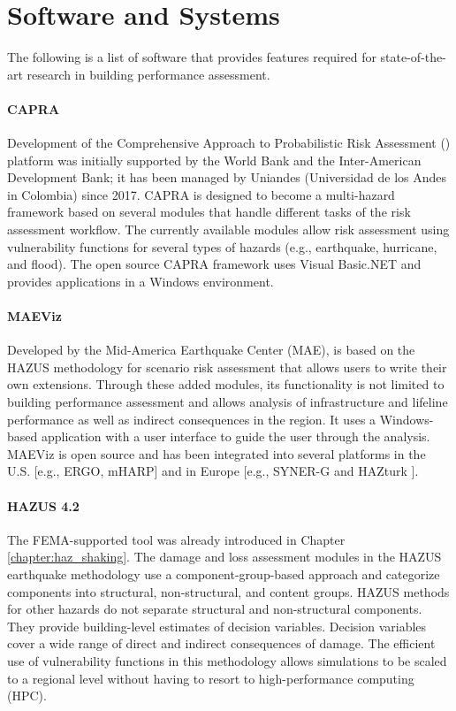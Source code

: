 \section{Software and Systems}
\label{sec:perf_bldg_tools}

The following is a list of software that provides features required for state-of-the-art research in building performance assessment.

\paragraph{CAPRA} Development of the Comprehensive Approach to Probabilistic Risk Assessment () platform was initially supported by the World Bank and the Inter-American Development Bank; it has been managed by Uniandes (Universidad de los Andes in Colombia) since 2017. CAPRA is designed to become a multi-hazard framework based on several modules that handle different tasks of the risk assessment workflow. The currently available modules allow risk assessment using vulnerability functions for several types of hazards (e.g., earthquake, hurricane, and flood). The open source CAPRA framework uses Visual Basic.NET and provides applications in a Windows environment.

\paragraph{MAEViz} 
Developed by the Mid-America Earthquake Center (MAE),  is based on the HAZUS methodology for scenario risk assessment that allows users to write their own extensions. Through these added modules, its functionality is not limited to building performance assessment and allows analysis of infrastructure and lifeline performance as well as indirect consequences in the region. It uses a Windows-based application with a user interface to guide the user through the analysis. MAEViz is open source and has been integrated into several platforms in the U.S. [e.g., ERGO, mHARP] and in Europe [e.g., SYNER-G \citep{pitilakis2014synerg} and HAZturk \citep{karaman2008earthquake}].

\paragraph{HAZUS 4.2} The FEMA-supported  tool was already introduced in Chapter \ref{chapter:haz_shaking}. The damage and loss assessment modules in the HAZUS earthquake methodology use a component-group-based approach and categorize components into structural, non-structural, and content groups. HAZUS methods for other hazards do not separate structural and non-structural components. They provide building-level estimates of decision variables. Decision variables cover a wide range of direct and indirect consequences of damage. The efficient use of vulnerability functions in this methodology allows simulations to be scaled to a regional level without having to resort to high-performance computing  (HPC).

